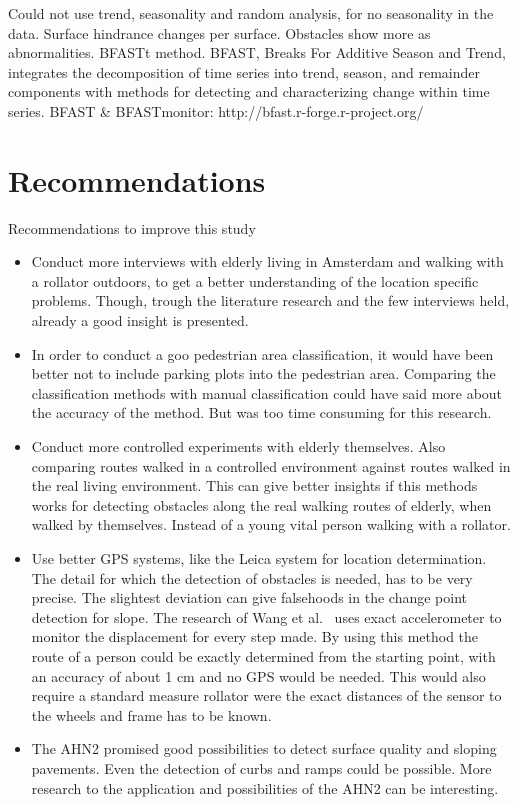 Could not use trend, seasonality and random analysis, for no seasonality in the data. Surface hindrance changes per surface. Obstacles show more as abnormalities. BFASTt method. BFAST, Breaks For Additive Season and Trend, integrates the decomposition of time series into trend, season, and remainder components with methods for detecting and characterizing change within time series. BFAST & BFASTmonitor: http://bfast.r-forge.r-project.org/ 



\section{Recommendations} %
Recommendations to improve this study
\begin{itemize}
\item Conduct more interviews with elderly living in Amsterdam and walking with a rollator outdoors, to get a better understanding of the location specific problems. Though, trough the literature research and the few interviews held, already a good insight is presented. 

\item In order to conduct a goo pedestrian area classification, it would have been better not to include parking plots into the pedestrian area. Comparing the classification methods with manual classification could have said more about the accuracy of the method. But was too time consuming for this research. 

\item Conduct more controlled experiments with elderly themselves. Also comparing routes walked in a controlled environment against routes walked in the real living environment. This can give better insights if this methods works for detecting obstacles along the real walking routes of elderly, when walked by themselves. Instead of a young vital person walking with a rollator. 

\item Use better GPS systems, like the Leica system for location determination. The detail for which the detection of obstacles is needed, has to be very precise. The slightest deviation can give falsehoods in the change point detection for slope. The research of Wang et al.~\cite{Wang2015} uses exact accelerometer to monitor the displacement for every step made. By using this method the route of a person could be exactly determined from the starting point, with an accuracy of about 1 cm and no GPS would be needed. This would also require a standard measure rollator were the exact distances of the sensor to the wheels and frame has to be known.

\item The AHN2 promised good possibilities to detect surface quality and sloping pavements. Even the detection of curbs and ramps could be possible. More research to the application and possibilities of the AHN2 can be interesting.
\end{itemize}
